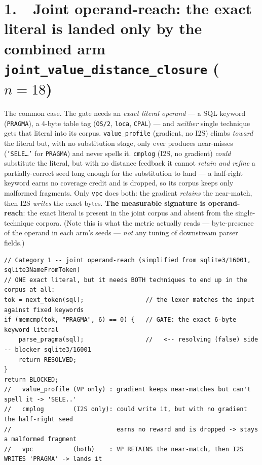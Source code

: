 \documentclass[11pt]{article}
\begin{document}
\section*{1.\ \ Joint operand-reach: the exact literal is landed only by the combined arm \hfill {\normalsize\texttt{joint\_value\_distance\_closure} ($n=18$)}}
The common case. The gate needs an \emph{exact literal operand} --- a SQL keyword
(\texttt{PRAGMA}), a 4-byte table tag (\texttt{OS/2}, \texttt{loca},
\texttt{CPAL}) --- and \emph{neither} single technique gets that literal into its
corpus. \texttt{value\_profile} (gradient, no I2S) climbs \emph{toward} the
literal but, with no substitution stage, only ever produces near-misses
(\texttt{'SELE\dots'} for \texttt{PRAGMA}) and never spells it. \texttt{cmplog}
(I2S, no gradient) \emph{could} substitute the literal, but with no distance
feedback it cannot \emph{retain and refine} a partially-correct seed long enough
for the substitution to land --- a half-right keyword earns no coverage credit
and is dropped, so its corpus keeps only malformed fragments. Only \texttt{vpc}
does both: the gradient \emph{retains} the near-match, then I2S \emph{writes} the
exact bytes. \textbf{The measurable signature is operand-reach}: the exact literal
is present in the joint corpus and absent from the single-technique corpora.
(Note this is what the metric actually reads --- byte-presence of the operand in
each arm's seeds --- \emph{not} any tuning of downstream parser fields.)

\begin{lstlisting}[style=c]
// Category 1 -- joint operand-reach (simplified from sqlite3/16001, sqlite3NameFromToken)
// ONE exact literal, but it needs BOTH techniques to end up in the corpus at all:
tok = next_token(sql);                 // the lexer matches the input against fixed keywords
if (memcmp(tok, "PRAGMA", 6) == 0) {   // GATE: the exact 6-byte keyword literal
    parse_pragma(sql);                 //   <-- resolving (false) side -- blocker sqlite3/16001
    return RESOLVED;
}
return BLOCKED;
//   value_profile (VP only) : gradient keeps near-matches but can't spell it -> 'SELE..'
//   cmplog        (I2S only): could write it, but with no gradient the half-right seed
//                             earns no reward and is dropped -> stays a malformed fragment
//   vpc           (both)    : VP RETAINS the near-match, then I2S WRITES 'PRAGMA' -> lands it
\end{lstlisting}
\end{document}
